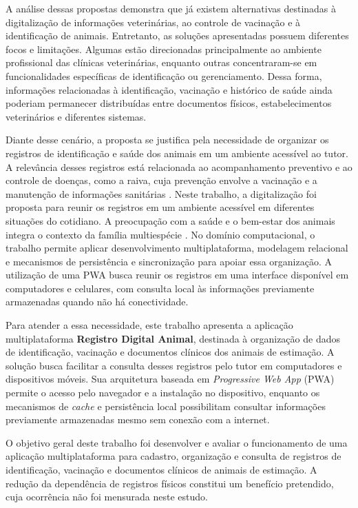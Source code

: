 \documentclass{UNESC}
\begin{document}
A análise dessas propostas demonstra que já existem alternativas destinadas à digitalização de informações veterinárias, ao controle de vacinação e à identificação de animais. Entretanto, as soluções apresentadas possuem diferentes focos e limitações. Algumas estão direcionadas principalmente ao ambiente profissional das clínicas veterinárias, enquanto outras concentraram-se em funcionalidades específicas de identificação ou gerenciamento. Dessa forma, informações relacionadas à identificação, vacinação e histórico de saúde ainda poderiam permanecer distribuídas entre documentos físicos, estabelecimentos veterinários e diferentes sistemas.

Diante desse cenário, a proposta se justifica pela necessidade de organizar os registros de identificação e saúde dos animais em um ambiente acessível ao tutor. A relevância desses registros está relacionada ao acompanhamento preventivo e ao controle de doenças, como a raiva, cuja prevenção envolve a vacinação e a manutenção de informações sanitárias \cite{MOUTINHO2017,murphy2008}. Neste trabalho, a digitalização foi proposta para reunir os registros em um ambiente acessível em diferentes situações do cotidiano. A preocupação com a saúde e o bem-estar dos animais integra o contexto da família multiespécie \cite{VIEIRA2020}. No domínio computacional, o trabalho permite aplicar desenvolvimento multiplataforma, modelagem relacional e mecanismos de persistência e sincronização para apoiar essa organização. A utilização de uma PWA busca reunir os registros em uma interface disponível em computadores e celulares, com consulta local às informações previamente armazenadas quando não há conectividade.

Para atender a essa necessidade, este trabalho apresenta a aplicação multiplataforma \textbf{Registro Digital Animal}, destinada à organização de dados de identificação, vacinação e documentos clínicos dos animais de estimação. A solução busca facilitar a consulta desses registros pelo tutor em computadores e dispositivos móveis. Sua arquitetura baseada em \textit{Progressive Web App} (PWA) permite o acesso pelo navegador e a instalação no dispositivo, enquanto os mecanismos de \textit{cache} e persistência local possibilitam consultar informações previamente armazenadas mesmo sem conexão com a internet.

O objetivo geral deste trabalho foi desenvolver e avaliar o funcionamento de uma aplicação multiplataforma para cadastro, organização e consulta de registros de identificação, vacinação e documentos clínicos de animais de estimação. A redução da dependência de registros físicos constitui um benefício pretendido, cuja ocorrência não foi mensurada neste estudo.
\end{document}

